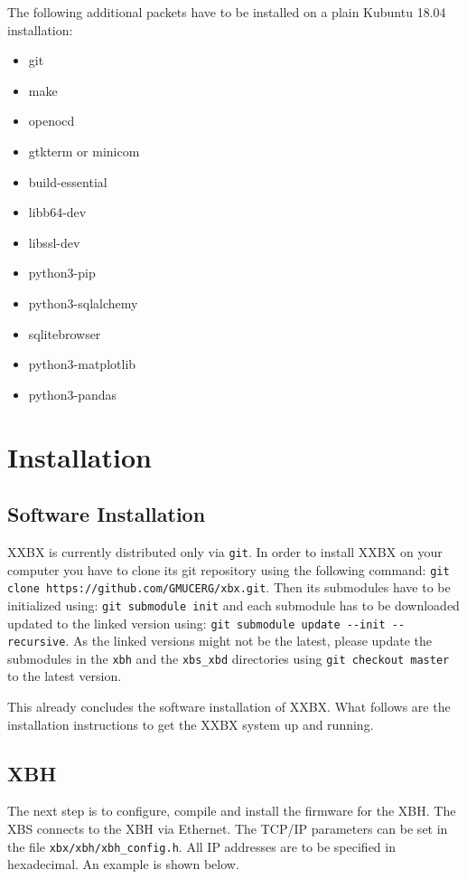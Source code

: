\documentclass[twoside,11pt]{cergdoc}
\begin{document}
  The following additional packets have to be installed on a plain Kubuntu 18.04 installation:
  \begin{itemize}
    \item git
    \item make
    \item openocd
    \item gtkterm or minicom
    \item build-essential
    \item libb64-dev
    \item libssl-dev
    \item python3-pip
    \item python3-sqlalchemy
    \item sqlitebrowser
    \item python3-matplotlib
    \item python3-pandas
  \end{itemize}

  \section{Installation}
    \subsection{Software Installation}

    XXBX is currently distributed only via \texttt{git}. In order to install XXBX on 
    your computer you have to clone its git repository using the following command:
    \verb|git clone https://github.com/GMUCERG/xbx.git|.
    Then its submodules have to be initialized using:
    \verb|git submodule init| and each submodule has to be downloaded updated to the linked
    version using: 
    \verb|git submodule update --init --recursive|.
    As the linked versions might not be the latest, please update the submodules in 
    the \verb|xbh| and the \verb|xbs_xbd| directories using 
    \verb|git checkout master| to the latest version. 

    This already concludes the software installation of XXBX. 
    What follows are the installation instructions to get the XXBX system up and 
    running. 

    \subsection{XBH}
The next step is to configure, compile and install the firmware for the XBH.
%
The XBS connects to the XBH via Ethernet. The TCP/IP parameters can be set
in the file \verb|xbx/xbh/xbh_config.h|. All IP addresses are to be specified
in hexadecimal. An example is shown below.
\end{document}
